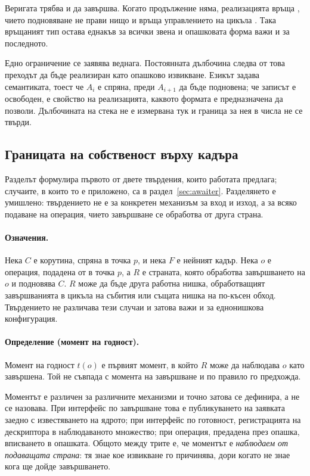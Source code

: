 Веригата трябва и да завършва. Когато продължение няма, реализацията връща
, чието подновяване не прави нищо и връща управлението на цикъла
\cite{cpp20standard}. Така връщаният тип остава еднакъв за всички звена и опашковата форма
важи и за последното.

Едно ограничение се заявява веднага. Постоянната дълбочина следва от това преходът да бъде
реализиран като опашково извикване. Езикът задава семантиката, тоест че \(A_i\) е спряна,
преди \(A_{i+1}\) да бъде подновена; че записът е освободен, е свойство на реализацията,
каквото формата е предназначена да позволи. Дълбочината на стека не е измервана тук и граница
за нея в числа не се твърди.

\subsection{Границата на собственост върху кадъра}
\label{sec:ownership}

Разделът формулира първото от двете твърдения, които работата предлага; случаите, в които то
е приложено, са в раздел~\ref{sec:awaiter}. Разделянето е умишлено: твърдението не е за
конкретен механизъм за вход и изход, а за всяко подаване на операция, чието завършване се
обработва от друга страна.

\paragraph{Означения.} Нека \(C\) е корутина, спряна в точка \(p\), и нека \(F\) е нейният
кадър. Нека \(o\) е операция, подадена от  в точка \(p\), а \(R\) е
страната, която обработва завършването на \(o\) и подновява \(C\). \(R\) може да бъде друга
работна нишка, обработващият завършванията в цикъла на събития или същата нишка на по-късен
обход. Твърдението не различава тези случаи и затова важи и за еднонишкова конфигурация.

\paragraph{Определение (момент на годност).} Момент на годност \(t(o)\) е първият момент, в
който \(R\) може да наблюдава \(o\) като завършена. Той не съвпада с момента на завършване и
по правило го предхожда.

Моментът е различен за различните механизми и точно затова се дефинира, а не се назовава. При
интерфейс по завършване това е публикуването на заявката заедно с известяването на ядрото;
при интерфейс по готовност, регистрацията на дескриптора в наблюдаваното множество; при
операция, предадена през опашка, вписването в опашката. Общото между трите е, че моментът е
\emph{наблюдаем от подаващата страна}: тя знае кое извикване го причинява, дори когато не
знае кога ще дойде завършването.

